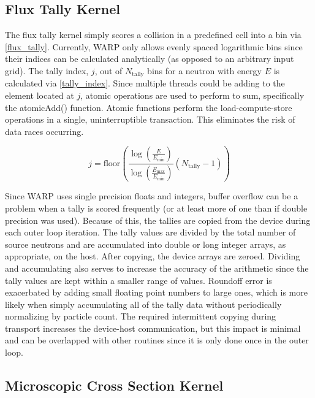 \subsection{Flux Tally Kernel}

The flux tally kernel simply scores a collision in a predefined cell into a bin via \eqref{flux_tally}.  Currently, WARP only allows evenly spaced logarithmic bins since their indices can be calculated analytically (as opposed to an arbitrary input grid).  The tally index, $j$, out of $N_\mathrm{tally}$ bins for a neutron with energy $E$ is calculated via \eqref{tally_index}.  Since multiple threads could be adding to the element located at $j$, atomic operations are used to perform to sum, specifically the atomicAdd() function.  Atomic functions perform the load-compute-store operations in a single, uninterruptible transaction.  This eliminates the risk of data races occurring.

\begin{equation}
j = \mathrm{floor} \left( \frac{ \log \left( \frac{E}{E_\mathrm{min}} \right)} { \log \left( \frac{E_\mathrm{max}}{E_\mathrm{min}} \right)} (N_\mathrm{tally}-1) \right)
\label{tally_index}
\end{equation}

Since WARP uses single precision floats and integers, buffer overflow can be a problem when a tally is scored frequently (or at least more of one than if double precision was used).  Because of this, the tallies are copied from the device during each outer loop iteration.  The tally values are divided by the total number of source neutrons and are accumulated into double or long integer arrays, as appropriate, on the host.  After copying, the device arrays are zeroed.  Dividing and accumulating also serves to increase the accuracy of the arithmetic since the tally values are kept within a smaller range of values. Roundoff error is exacerbated by adding small floating point numbers to large ones, which is more likely when simply accumulating all of the tally data without periodically normalizing by particle count.  The required intermittent copying during transport increases the device-host communication, but this impact is minimal and can be overlapped with other routines since it is only done once in the outer loop.

\subsection{Microscopic Cross Section Kernel}

